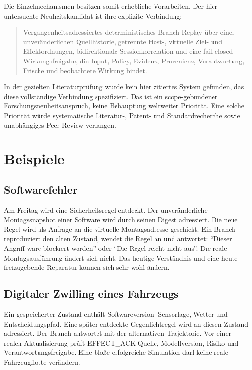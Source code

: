 \documentclass[11pt,a4paper]{article}
\theoremstyle{remark}
\begin{document}
Die Einzelmechanismen besitzen somit erhebliche Vorarbeiten. Der hier
untersuchte Neuheitskandidat ist ihre explizite Verbindung:

\begin{quote}
Vergangenheitsadressiertes deterministisches Branch-Replay über einer
unveränderlichen Quellhistorie, getrennte Host-, virtuelle Ziel- und
Effektordnungen, bidirektionale Sessionkorrelation und eine fail-closed
Wirkungsfreigabe, die Input, Policy, Evidenz, Provenienz, Verantwortung,
Frische und beobachtete Wirkung bindet.
\end{quote}

In der gezielten Literaturprüfung wurde kein hier zitiertes System gefunden,
das diese vollständige Verbindung spezifiziert. Das ist ein scope-gebundener
Forschungsneuheitsanspruch, keine Behauptung weltweiter Priorität. Eine solche
Priorität würde systematische Literatur-, Patent- und Standardrecherche sowie
unabhängiges Peer Review verlangen.

\section{Beispiele}

\subsection{Softwarefehler}

Am Freitag wird eine Sicherheitsregel entdeckt. Der unveränderliche
Montagssnapshot einer Software wird durch seinen Digest adressiert. Die neue
Regel wird als Anfrage an die virtuelle Montagsadresse geschickt. Ein Branch
reproduziert den alten Zustand, wendet die Regel an und antwortet: ``Dieser
Angriff wäre blockiert worden'' oder ``Die Regel reicht nicht aus''. Die
reale Montagsausführung ändert sich nicht. Das heutige Verständnis und eine
heute freizugebende Reparatur können sich sehr wohl ändern.

\subsection{Digitaler Zwilling eines Fahrzeugs}

Ein gespeicherter Zustand enthält Softwareversion, Sensorlage, Wetter und
Entscheidungspfad. Eine später entdeckte Gegenlichtregel wird an diesen
Zustand adressiert. Der Branch antwortet mit der alternativen Trajektorie.
Vor einer realen Aktualisierung prüft EFFECT\_ACK Quelle, Modellversion,
Risiko und Verantwortungsfreigabe. Eine bloße erfolgreiche Simulation darf
keine reale Fahrzeugflotte verändern.
\end{document}
